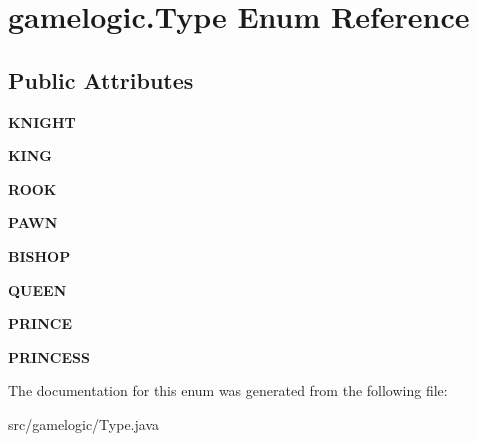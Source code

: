 \hypertarget{enumgamelogic_1_1_type}{}\section{gamelogic.\+Type Enum Reference}
\label{enumgamelogic_1_1_type}
\subsection*{Public Attributes}
\begin{DoxyCompactItemize}
\item 
\mbox{\label{enumgamelogic_1_1_type_abf0533404306835768de03bbbe47cbfd}} 
{\bfseries K\+N\+I\+G\+HT}
\item 
\mbox{\label{enumgamelogic_1_1_type_a456bda7e831b59ee1008a5121b1a6ab8}} 
{\bfseries K\+I\+NG}
\item 
\mbox{\label{enumgamelogic_1_1_type_a5b6ab48650f63932b9be133afe0e266d}} 
{\bfseries R\+O\+OK}
\item 
\mbox{\label{enumgamelogic_1_1_type_a12ed260808e761ee21e6aa29f2154915}} 
{\bfseries P\+A\+WN}
\item 
\mbox{\label{enumgamelogic_1_1_type_a6da8ee06cce75fa08f0a984ef7e84f42}} 
{\bfseries B\+I\+S\+H\+OP}
\item 
\mbox{\label{enumgamelogic_1_1_type_a2e9397920ba6abf38cc942de8a484fcb}} 
{\bfseries Q\+U\+E\+EN}
\item 
\mbox{\label{enumgamelogic_1_1_type_abd4398549d5aee3ba9444d5ac92161ca}} 
{\bfseries P\+R\+I\+N\+CE}
\item 
\mbox{\label{enumgamelogic_1_1_type_a969c8cc9de737587a1d6237e43b6ac13}} 
{\bfseries P\+R\+I\+N\+C\+E\+SS}
\end{DoxyCompactItemize}


The documentation for this enum was generated from the following file\+:\begin{DoxyCompactItemize}
\item 
src/gamelogic/Type.\+java\end{DoxyCompactItemize}
